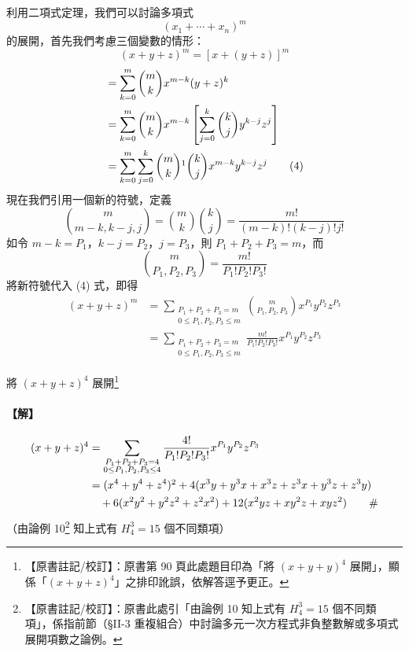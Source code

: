 利用二項式定理，我們可以討論多項式
\[ (x_1 + \dotsb + x_n)^m \]
的展開，首先我們考慮三個變數的情形：
\[ (x + y + z)^m = [x + (y + z)]^m \]
\begin{align}
&= \sum_{k=0}^m \binom{m}{k} x^{m-k} (y + z)^k \notag \\
&= \sum_{k=0}^m \binom{m}{k} x^{m-k} \left[ \sum_{j=0}^k \binom{k}{j} y^{k-j} z^j \right] \notag \\
&= \sum_{k=0}^m \sum_{j=0}^k \binom{m}{k}\footnotemark \binom{k}{j} x^{m-k} y^{k-j} z^j \label{eq:b5s-2-4-4}\tag{4}
\end{align}
\label{note:b5s-ch2-p90-binom}
現在我們引用一個新的符號，定義
\[ \binom{m}{m-k, k-j, j} = \binom{m}{k} \binom{k}{j} = \frac{m!}{(m-k)!(k-j)!j!} \]
如令 $m - k = P_1$，$k - j = P_2$，$j = P_3$，則 $P_1 + P_2 + P_3 = m$，而
\[ \binom{m}{P_1, P_2, P_3} = \frac{m!}{P_1! P_2! P_3!} \]
將新符號代入 (4) 式，即得
\begin{align*}
(x + y + z)^m &= \sum_{\substack{P_1 + P_2 + P_3 = m \\ 0 \le P_1, P_2, P_3 \le m}} \binom{m}{P_1, P_2, P_3} x^{P_1} y^{P_2} z^{P_3} \\
&= \sum_{\substack{P_1 + P_2 + P_3 = m \\ 0 \le P_1, P_2, P_3 \le m}} \frac{m!}{P_1! P_2! P_3!} x^{P_1} y^{P_2} z^{P_3}
\end{align*}

\medskip
\begin{discussion}\label{ex:b5s-2-disc11}
將 $(x + y + z)^4$ 展開\label{note:b5s-ch2-p90-ex11-typo}\footnote{【原書註記/校訂】：原書第 90 頁此處題目印為「將 $(x+y+y)^4$ 展開」，顯係「$(x+y+z)^4$」之排印訛誤，依解答逕予更正。}
\end{discussion}
\paragraph{【解】}
\begin{align*}
(x + y + z)^4 &= \sum_{\substack{P_1 + P_2 + P_3 = 4 \\ 0 \le P_1, P_2, P_3 \le 4}} \frac{4!}{P_1! P_2! P_3!} x^{P_1} y^{P_2} z^{P_3} \\
&= (x^4 + y^4 + z^4)\footnotemark + 4(x^3 y + y^3 x + x^3 z + z^3 x + y^3 z + z^3 y) \\
&\quad + 6(x^2 y^2 + y^2 z^2 + z^2 x^2) + 12(x^2 yz + xy^2 z + xyz^2) \qquad \#
\end{align*}
\label{note:b5s-ch2-p90-ex11-y4}%
（由論例 10\label{note:b5s-ch2-p90-disc10}\footnote{【原書註記/校訂】：原書此處引「由論例 10 知上式有 $H_4^3 = 15$ 個不同類項」，係指前節（\S II-3 重複組合）中討論多元一次方程式非負整數解或多項式展開項數之論例。} 知上式有 $H_4^3 = 15$ 個不同類項）

